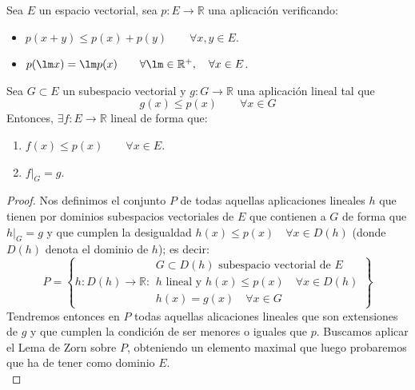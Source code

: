 \begin{teo}
    Sea $E$ un espacio vectorial, sea $p:E\to \mathbb{R}$ una aplicación verificando:
    \begin{itemize}
        \item $p(x+y) \leq p(x) + p(y) \qquad \forall x,y\in E$.
        \item $p(\lm x) = \lm p(x) \qquad \forall \lm \in \mathbb{R}^+ , \quad \forall x\in E$.
    \end{itemize}
    Sea $G\subset E$ un subespacio vectorial y $g:G\to \mathbb{R}$ una aplicación lineal tal que
    \begin{equation*}
        g(x) \leq p(x) \qquad \forall x\in G
    \end{equation*}
    Entonces, $\exists f:E\to \mathbb{R}$ lineal de forma que: 
    \begin{enumerate}
        \item $f(x) \leq p(x) \qquad \forall x\in E$.
        \item $f\big|_G = g$.
    \end{enumerate}
    \begin{proof}
        Nos definimos el conjunto $P$ de todas aquellas aplicaciones lineales $h$ que tienen por dominios subespacios vectoriales de $E$ que contienen a $G$ de forma que $h\big|_G = g$ y que cumplen la desigualdad $h(x) \leq p(x) \quad \forall x\in D(h)$ (donde $D(h)$ denota el dominio de $h$); es decir:
        \begin{equation*}
            P = \left\{h:D(h) \to \mathbb{R} : \left.\begin{array}{l}
                G\subset D(h) \text{\ subespacio vectorial de\ } E \\
                h \text{\ lineal y\ } h(x) \leq p(x) \quad \forall x\in D(h) \\
                h(x) = g(x) \quad \forall x\in G
            \end{array}\right.\right\}
        \end{equation*}
        Tendremos entonces en $P$ todas aquellas alicaciones lineales que son extensiones de $g$ y que cumplen la condición de ser menores o iguales que $p$. Buscamos aplicar el Lema de Zorn sobre $P$, obteniendo un elemento maximal que luego probaremos que ha de tener como dominio $E$.\\


\end{proof}
\end{teo}
